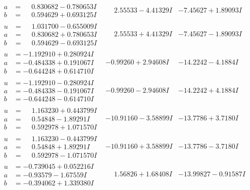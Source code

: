 \documentclass[1p]{elsarticle_modified}
\theoremstyle{definition}
\begin{document}
$$\begin{array}{c|c|c}
\begin{aligned}
a &= \phantom{-}0.830682 - 0.780653 I \\
b &= \phantom{-}0.594629 + 0.693125 I\end{aligned}
 & \phantom{-}2.55533 - 4.41329 I & -7.45627 + 1.89093 I \\ \hline\begin{aligned}
u &= \phantom{-}1.031700 - 0.655009 I \\
a &= \phantom{-}0.830682 + 0.780653 I \\
b &= \phantom{-}0.594629 - 0.693125 I\end{aligned}
 & \phantom{-}2.55533 + 4.41329 I & -7.45627 - 1.89093 I \\ \hline\begin{aligned}
u &= -1.192910 + 0.280924 I \\
a &= -0.484338 + 0.191067 I \\
b &= -0.644248 + 0.614710 I\end{aligned}
 & -0.99260 + 2.94608 I & -14.2242 - 4.1884 I \\ \hline\begin{aligned}
u &= -1.192910 - 0.280924 I \\
a &= -0.484338 - 0.191067 I \\
b &= -0.644248 - 0.614710 I\end{aligned}
 & -0.99260 - 2.94608 I & -14.2242 + 4.1884 I \\ \hline\begin{aligned}
u &= \phantom{-}1.163230 + 0.443799 I \\
a &= \phantom{-}0.54848 - 1.89291 I \\
b &= \phantom{-}0.592978 + 1.071570 I\end{aligned}
 & -10.91160 - 3.58899 I & -13.7786 + 3.7180 I \\ \hline\begin{aligned}
u &= \phantom{-}1.163230 - 0.443799 I \\
a &= \phantom{-}0.54848 + 1.89291 I \\
b &= \phantom{-}0.592978 - 1.071570 I\end{aligned}
 & -10.91160 + 3.58899 I & -13.7786 - 3.7180 I \\ \hline\begin{aligned}
u &= -0.739045 + 0.052216 I \\
a &= -0.93579 - 1.67559 I \\
b &= -0.394062 + 1.339380 I\end{aligned}
 & \phantom{-}1.56826 + 1.68408 I & -13.99827 - 0.91587 I \\ \hline\begin{aligned}

\end{aligned}
\end{array}$$
\end{document}

